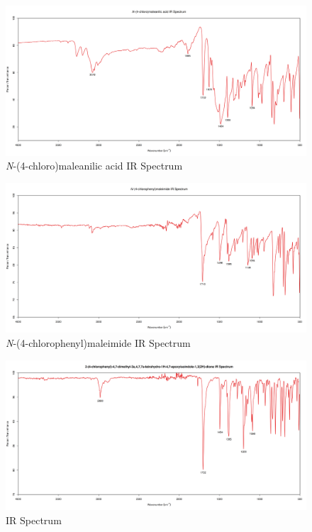 \documentclass[11pt]{article}
\begin{document}
\begin{figure}[H]
    \centering
    \includegraphics[scale=0.33]{spectra/ir9.1.png}
    \caption{\textit{N}-(4-chloro)maleanilic acid IR Spectrum}
\end{figure}
\begin{figure}[H]
    \centering
    \includegraphics[scale=0.33]{spectra/ir9.2.png}
    \caption{\textit{N}-(4-chlorophenyl)maleimide IR Spectrum}
\end{figure}
\begin{figure}[H]
    \centering
    \includegraphics[scale=0.33]{spectra/ir9.3.png}
    \caption{IR Spectrum}
\end{figure}
\end{document}
